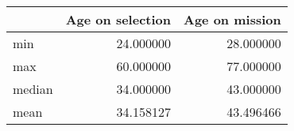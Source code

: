 \begin{tabular}{lrr}
\toprule
 & Age on selection & Age on mission \\
\midrule
min & 24.000000 & 28.000000 \\
max & 60.000000 & 77.000000 \\
median & 34.000000 & 43.000000 \\
mean & 34.158127 & 43.496466 \\
\bottomrule
\end{tabular}
